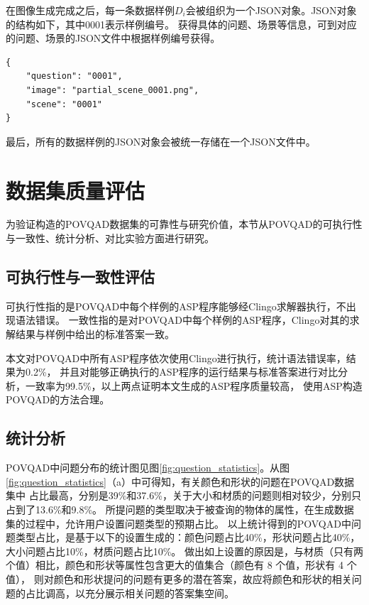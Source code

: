 在图像生成完成之后，每一条数据样例$D_i$会被组织为一个JSON对象。JSON对象的结构如下，其中0001表示样例编号。
获得具体的问题、场景等信息，可到对应的问题、场景的JSON文件中根据样例编号获得。
\begin{lstlisting}
{
    "question": "0001",
    "image": "partial_scene_0001.png",
    "scene": "0001"
}
\end{lstlisting}

最后，所有的数据样例的JSON对象会被统一存储在一个JSON文件中。
\section{数据集质量评估}
为验证构造的POVQAD数据集的可靠性与研究价值，本节从POVQAD的可执行性与一致性、统计分析、对比实验方面进行研究。
\subsection{可执行性与一致性评估}
可执行性指的是POVQAD中每个样例的ASP程序能够经Clingo求解器执行，不出现语法错误。
一致性指的是对POVQAD中每个样例的ASP程序，Clingo对其的求解结果与样例中给出的标准答案一致。

本文对POVQAD中所有ASP程序依次使用Clingo进行执行，统计语法错误率，结果为0.2\%，
并且对能够正确执行的ASP程序的运行结果与标准答案进行对比分析，一致率为99.5\%，以上两点证明本文生成的ASP程序质量较高，
使用ASP构造POVQAD的方法合理。
\subsection{统计分析}
POVQAD中问题分布的统计图见图\ref{fig:question_statistics}。从图\ref{fig:question_statistics}（a）中可得知，有关颜色和形状的问题在POVQAD数据集中
占比最高，分别是39\%和37.6\%，关于大小和材质的问题则相对较少，分别只占到了13.6\%和9.8\%。
所提问题的类型取决于被查询的物体的属性，在生成数据集的过程中，允许用户设置问题类型的预期占比。
以上统计得到的POVQAD中问题类型占比，是基于以下的设置生成的：颜色问题占比40\%，形状问题占比40\%，大小问题占比10\%，材质问题占比10\%。
做出如上设置的原因是，与材质（只有两个值）相比，颜色和形状等属性包含更大的值集合（颜色有 8 个值，形状有 4 个值），
则对颜色和形状提问的问题有更多的潜在答案，故应将颜色和形状的相关问题的占比调高，以充分展示相关问题的答案集空间。

